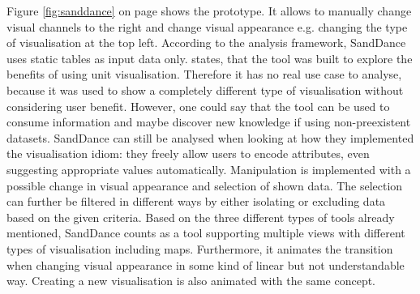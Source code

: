 Figure \ref{fig:sanddance} on page \pageref{fig:sanddance} shows the prototype. It allows to manually change visual channels to the right and change visual appearance e.g. changing the type of visualisation at the top left. According to the analysis framework, SandDance uses static tables as input data only. \citeauthor{Drucker2015} states, that the tool was built to explore the benefits of using unit visualisation. Therefore it has no real use case to analyse, because it was used to show a completely different type of visualisation without considering user benefit. However, one could say that the tool can be used to consume information and maybe discover new knowledge if using non-preexistent datasets.
SandDance can still be analysed when looking at how they implemented the visualisation idiom: they freely allow users to encode attributes, even suggesting appropriate values automatically. Manipulation is implemented with a possible change in visual appearance and selection of shown data. The selection can further be filtered in different ways by either isolating or excluding data based on the given criteria.
Based on the three different types of tools already mentioned, SandDance counts as a tool supporting multiple views with different types of visualisation including maps. Furthermore, it animates the transition when changing visual appearance in some kind of linear but not understandable way. Creating a new visualisation is also animated with the same concept.

